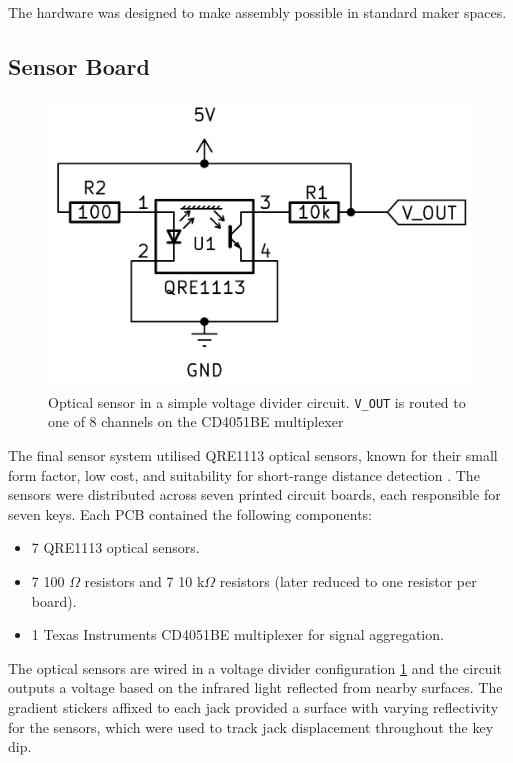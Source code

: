 The hardware was designed to make assembly possible in standard maker spaces.  

\subsection{Sensor Board}\label{sensor-board}

\begin{figure}[!b] 
  \centering
  \includegraphics[width=0.7\linewidth]{src/images/simple-schematic-bw-.jpg} 
  \caption{Optical sensor in a simple voltage divider circuit. \texttt{V\_OUT} is routed to one of 8 channels on the CD4051BE multiplexer}
  \Description{} 
  \label{fig:simple-schematic}
\end{figure}

The final sensor system utilised QRE1113 optical sensors, known for their small form factor, low cost, and suitability for short-range distance detection \cite{McPherson2013, McPherson2019}. The sensors were distributed across seven printed circuit boards, each responsible for seven keys. Each PCB contained the following components:

\begin{itemize}
    \item 7 QRE1113 optical sensors.
    \item 7 100 $\Omega$ resistors and 7 10 k$\Omega$ resistors (later reduced to one resistor per board).
    \item 1 Texas Instruments CD4051BE multiplexer for signal aggregation.
\end{itemize}

The optical sensors are wired in a voltage divider configuration \ref{fig:simple-schematic} and the circuit outputs a voltage based on the infrared light reflected from nearby surfaces. 
The gradient stickers affixed to each jack provided a surface with varying reflectivity for the sensors, which were used to track jack displacement throughout the key dip. 

